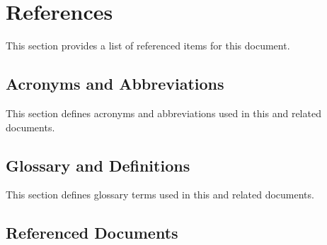 
\chapter{References}
\label{loc:References}

This section provides a list of referenced items for this document.

\section{Acronyms and Abbreviations}
\label{loc:refs_AcronymsandAbbreviations}

This section defines acronyms and abbreviations used in this and related documents.



\KNEADSECTIONNEWPAGE
\section{Glossary and Definitions}
\label{loc:refs_GlossaryandDefinitions}

This section defines glossary terms used in this and related documents.



\KNEADSECTIONNEWPAGE
\section{Referenced Documents}
\label{loc:Refs_Documents}

\KNEADChapTwoReferences%

